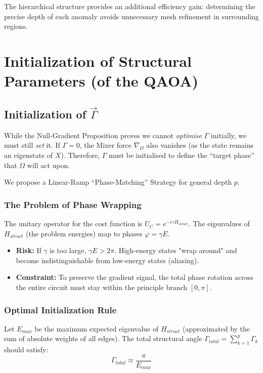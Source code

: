 \documentclass[12pt, a4paper, oneside]{report}
\begin{document}
The hierarchical structure provides an additional efficiency gain: determining the precise depth of each anomaly avoids unnecessary mesh refinement in surrounding regions.

\section{Initialization of Structural Parameters (of the QAOA)}
\label{sec:initialization}
\subsection{Initialization of $\vec{\Gamma}$}

While the Null-Gradient Proposition proves we cannot \textit{optimise} $\Gamma$ initially, we must still \textit{set} it. If $\Gamma=0$, the Mixer force $\nabla_\Omega$ also vanishes (as the state remains an eigenstate of $X$). Therefore, $\Gamma$ must be initialised to define the ``target phase'' that $\Omega$ will act upon.

We propose a Linear-Ramp ``Phase-Matching'' Strategy for general depth $p$.

\subsubsection{The Problem of Phase Wrapping}
The unitary operator for the cost function is $U_C = e^{-i \gamma H_{struct}}$.
The eigenvalues of $H_{struct}$ (the problem energies) map to phases $\varphi = \gamma E$.
\begin{itemize}
    \item \textbf{Risk:} If $\gamma$ is too large, $\gamma E > 2\pi$. High-energy states "wrap around" and become indistinguishable from low-energy states (aliasing).
    \item \textbf{Constraint:} To preserve the gradient signal, the total phase rotation across the entire circuit must stay within the principle branch $[0, \pi]$.
\end{itemize}

\subsubsection{Optimal Initialization Rule}
Let $E_{max}$ be the maximum expected eigenvalue of $H_{struct}$ (approximated by the sum of absolute weights of all edges).
The total structural angle $\Gamma_{total} = \sum_{k=1}^p \Gamma_k$ should satisfy:
\begin{equation}
    \Gamma_{total} \approx \frac{\pi}{E_{max}}
\end{equation}
\end{document}
